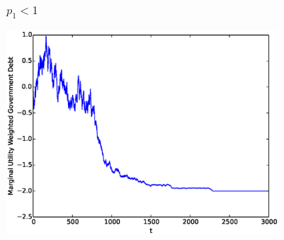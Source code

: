 \documentclass{beamer}
\begin{document}
\begin{frame}
	\frametitle{$p_1 < 1$}
	\begin{center}
	\includegraphics[width=4in]{Images/port2.eps}
	\end{center}
\end{frame}
%
%
%
\end{document}
